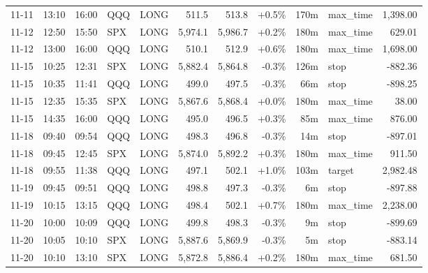 \documentclass[11pt,a4paper,twoside]{article}
\begin{document}
\begin{center}
\begin{longtable}{>{\color{txtmain}}l l l l l r r r r >{\color{txtmain}}l r}
11-11 & 13:10 & 16:00 & QQQ & LONG & 511.5 & 513.8 & \textcolor{wingreen}{+0.5\%} & 170m & max\_time & \textcolor{wingreen}{1,398.00} \\
11-12 & 12:50 & 15:50 & SPX & LONG & 5,974.1 & 5,986.7 & \textcolor{wingreen}{+0.2\%} & 180m & max\_time & \textcolor{wingreen}{629.01} \\
11-12 & 13:00 & 16:00 & QQQ & LONG & 510.1 & 512.9 & \textcolor{wingreen}{+0.6\%} & 180m & max\_time & \textcolor{wingreen}{1,698.00} \\
11-15 & 10:25 & 12:31 & SPX & LONG & 5,882.4 & 5,864.8 & \textcolor{lossred}{-0.3\%} & 126m & stop & \textcolor{lossred}{-882.36} \\
11-15 & 10:35 & 11:41 & QQQ & LONG & 499.0 & 497.5 & \textcolor{lossred}{-0.3\%} & 66m & stop & \textcolor{lossred}{-898.25} \\
11-15 & 12:35 & 15:35 & SPX & LONG & 5,867.6 & 5,868.4 & \textcolor{wingreen}{+0.0\%} & 180m & max\_time & \textcolor{wingreen}{38.00} \\
11-15 & 14:35 & 16:00 & QQQ & LONG & 495.0 & 496.5 & \textcolor{wingreen}{+0.3\%} & 85m & max\_time & \textcolor{wingreen}{876.00} \\
11-18 & 09:40 & 09:54 & QQQ & LONG & 498.3 & 496.8 & \textcolor{lossred}{-0.3\%} & 14m & stop & \textcolor{lossred}{-897.01} \\
11-18 & 09:45 & 12:45 & SPX & LONG & 5,874.0 & 5,892.2 & \textcolor{wingreen}{+0.3\%} & 180m & max\_time & \textcolor{wingreen}{911.50} \\
11-18 & 09:55 & 11:38 & QQQ & LONG & 497.1 & 502.1 & \textcolor{wingreen}{+1.0\%} & 103m & target & \textcolor{wingreen}{2,982.48} \\
11-19 & 09:45 & 09:51 & QQQ & LONG & 498.8 & 497.3 & \textcolor{lossred}{-0.3\%} & 6m & stop & \textcolor{lossred}{-897.88} \\
11-19 & 10:15 & 13:15 & QQQ & LONG & 498.4 & 502.1 & \textcolor{wingreen}{+0.7\%} & 180m & max\_time & \textcolor{wingreen}{2,238.00} \\
11-20 & 10:00 & 10:09 & QQQ & LONG & 499.8 & 498.3 & \textcolor{lossred}{-0.3\%} & 9m & stop & \textcolor{lossred}{-899.69} \\
11-20 & 10:05 & 10:10 & SPX & LONG & 5,887.6 & 5,869.9 & \textcolor{lossred}{-0.3\%} & 5m & stop & \textcolor{lossred}{-883.14} \\
11-20 & 10:10 & 13:10 & SPX & LONG & 5,872.8 & 5,886.4 & \textcolor{wingreen}{+0.2\%} & 180m & max\_time & \textcolor{wingreen}{681.50} \\

\end{longtable}
\end{center}
\end{document}
